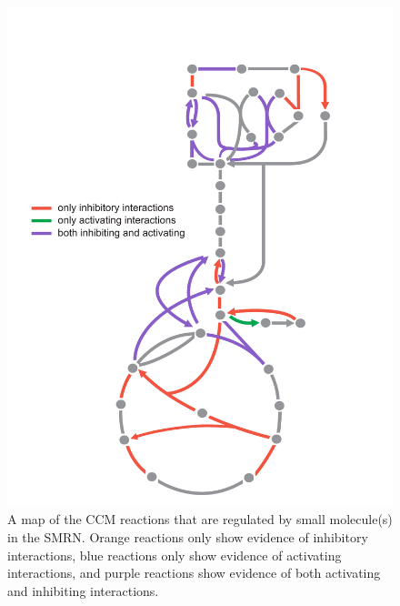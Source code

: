 \documentclass[12pt,a4paper]{article}
\begin{document}
\begin{figure}[ht!]
	\includegraphics[width=\textwidth]{../manuscript/figS8.pdf}
	\caption{A map of the CCM reactions that are regulated by small molecule(s) in the SMRN. Orange reactions only show evidence of inhibitory interactions, blue reactions only show evidence of activating interactions, and purple reactions show evidence of both activating and inhibiting interactions.
	}
\end{figure}
\end{document}
